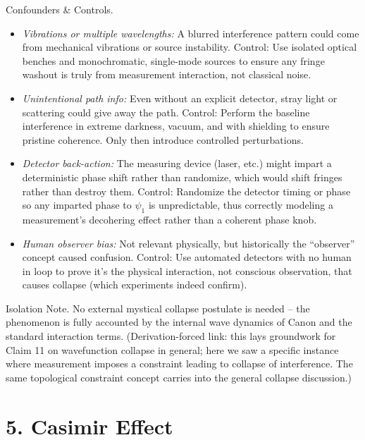 \documentclass[11pt]{article}
\begin{document}
Confounders & Controls.


\begin{itemize}

\item 
\textit{Vibrations or multiple wavelengths:} A blurred interference pattern could come from mechanical vibrations or source instability. Control: Use isolated optical benches and monochromatic, single-mode sources to ensure any fringe washout is truly from measurement interaction, not classical noise.




\item 
\textit{Unintentional path info:} Even without an explicit detector, stray light or scattering could give away the path. Control: Perform the baseline interference in extreme darkness, vacuum, and with shielding to ensure pristine coherence. Only then introduce controlled perturbations.




\item 
\textit{Detector back-action:} The measuring device (laser, etc.) might impart a deterministic phase shift rather than randomize, which would shift fringes rather than destroy them. Control: Randomize the detector timing or phase so any imparted phase to $\psi_1$ is unpredictable, thus correctly modeling a measurement’s decohering effect rather than a coherent phase knob.




\item 
\textit{Human observer bias:} Not relevant physically, but historically the “observer” concept caused confusion. Control: Use automated detectors with no human in loop to prove it’s the physical interaction, not conscious observation, that causes collapse (which experiments indeed confirm).




\end{itemize}

Isolation Note. No external mystical collapse postulate is needed – the phenomenon is fully accounted by the internal wave dynamics of Canon and the standard interaction terms. (Derivation-forced link: this lays groundwork for Claim 11 on wavefunction collapse in general; here we saw a specific instance where measurement imposes a constraint leading to collapse of interference. The same topological constraint concept carries into the general collapse discussion.)


\section*{5. Casimir Effect}
\end{document}
